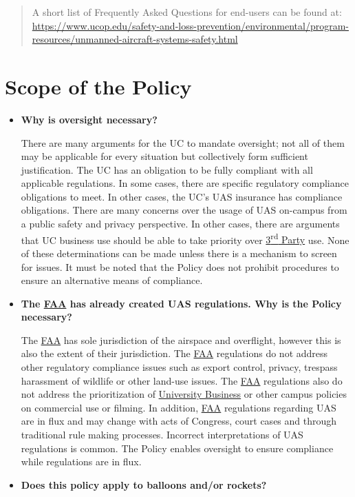\documentclass[
]{book}
\begin{document}
\begin{quote}
A short list of Frequently Asked Questions for end-users can be found at: \url{https://www.ucop.edu/safety-and-loss-prevention/environmental/program-resources/unmanned-aircraft-systems-safety.html}
\end{quote}

\hypertarget{scope-of-the-policy}{%
\section{Scope of the Policy}\label{scope-of-the-policy}}

\begin{itemize}
\item
  \textbf{Why is oversight necessary?}

  There are many arguments for the UC to mandate oversight; not all of them may be applicable for every situation but collectively form sufficient justification. The UC has an obligation to be fully compliant with all applicable regulations. In some cases, there are specific regulatory compliance obligations to meet. In other cases, the UC's UAS insurance has compliance obligations. There are many concerns over the usage of UAS on-campus from a public safety and privacy perspective. In other cases, there are arguments that UC business use should be able to take priority over \protect\hyperlink{rdparty}{3\textsuperscript{rd} Party} use. None of these determinations can be made unless there is a mechanism to screen for issues. It must be noted that the Policy does not prohibit procedures to ensure an alternative means of compliance.
\item
  \textbf{The \protect\hyperlink{FAA}{FAA} has already created UAS regulations. Why is the Policy necessary?}

  The \protect\hyperlink{FAA}{FAA} has sole jurisdiction of the airspace and overflight, however this is also the extent of their jurisdiction. The \protect\hyperlink{FAA}{FAA} regulations do not address other regulatory compliance issues such as export control, privacy, trespass harassment of wildlife or other land-use issues. The \protect\hyperlink{FAA}{FAA} regulations also do not address the prioritization of \protect\hyperlink{UB}{University Business} or other campus policies on commercial use or filming. In addition, \protect\hyperlink{FAA}{FAA} regulations regarding UAS are in flux and may change with acts of Congress, court cases and through traditional rule making processes. Incorrect interpretations of UAS regulations is common. The Policy enables oversight to ensure compliance while regulations are in flux.
\item
  \textbf{Does this policy apply to balloons and/or rockets?}


\end{itemize}
\end{document}
